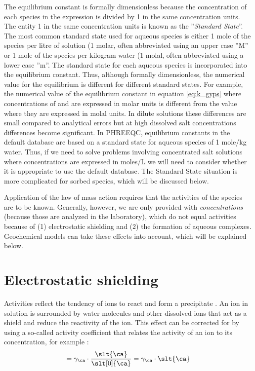 The equilibrium constant is formally dimensionless because the concentration of each species in the expression is divided by 1 in the same concentration units.  The entity 1 in the same concentration units is known as the ''\textit{Standard State}''.  The most common standard state used for aqueous species is either 1 mole of the species per litre of solution (1 molar, often abbreviated using an upper case ''M'' or 1 mole of the species per kilogram water (1 molal, often abbreviated using a lower case ''m''.  The standard state for each aqueous species is incorporated into the equilibrium constant. Thus, although formally dimensionless, the numerical value for the equilibrium is different for different standard states.  For example, the numerical value of the equilibrium constant in equation \ref{eq:k_gyps} where concentrations of \ca and \su are expressed in molar units is different from the value where they are expressed in molal units. In dilute solutions these differences are small compared to analytical errors but at high dissolved salt concentrations differences become significant. In PHREEQC, equilibrium constants in the default database are based on a standard state for aqueous species of 1 mole/kg water. Thus, if we need to solve problems involving concentrated salt solutions where concentrations are expressed in moles/L we will need to consider whether it is appropriate to use the default database. The Standard State situation is more complicated for sorbed species, which will be discussed below.

Application of the law of mass action requires that the activities of the species are to be known. Generally, however, we are only provided with \textit{concentrations} (because those are analyzed in the laboratory), which do not equal activities because of (1) electrostatic shielding and (2) the formation of aqueous complexes. Geochemical models can take these effects into account, which will be explained below.

\section{Electrostatic shielding}
Activities reflect the tendency of ions to react and form a precipitate \citep{ap2005}. An ion in solution is surrounded by water molecules and other dissolved ions that act as a shield and reduce the reactivity of the ion. This effect can be corrected for by using a so-called activity coefficient that relates the activity of an ion to its concentration, for example \ca:
\begin{equation}
[\ca]=\gamma_{\ca} \cdot \frac{\slt{\ca}}{\slt[0]{\ca}} = \gamma_\ca \cdot \slt{\ca}
\end{equation}


